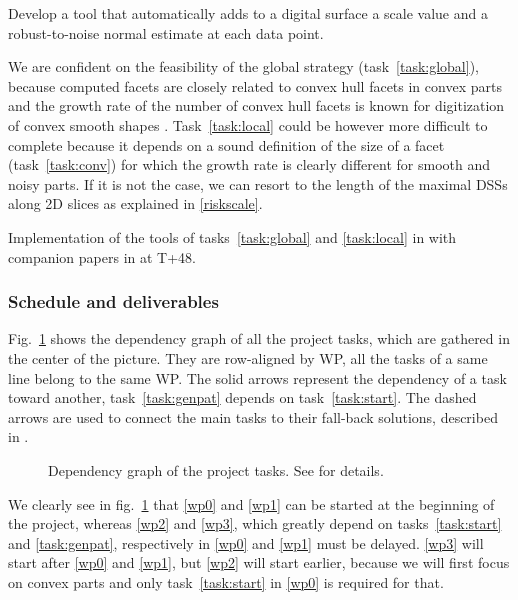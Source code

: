 \begin{Task}
  \label{task:local}
  Develop a tool that automatically adds to a digital surface a scale value and
  a robust-to-noise normal estimate at each data point. 
\end{Task}

\Risks
We are confident on the feasibility of the global strategy (task~\ref{task:global}),
because computed facets are closely related to convex hull facets in convex parts
and the growth rate of the number of convex hull facets is known for digitization
of convex smooth shapes \cite{Barany1998}. 
Task~\ref{task:local} could be however more difficult to complete
because it depends on a sound definition of the size of a facet (task~\ref{task:conv})
for which the growth rate is clearly different for smooth and noisy parts. If it is
not the case, we can resort to the length of the maximal DSSs along 2D slices
as explained in \ref{riskscale}.

\Success
  Implementation of the tools of tasks~\ref{task:global} and \ref{task:local}
    in {\DGtalTools} with companion papers in {\IPOL} at T+48.

    

\subsubsection{Schedule and deliverables}
\label{sec:schedule}

Fig.~\ref{fig:tasks} shows the dependency graph of all the project tasks, which
are gathered in the center of the picture. They are row-aligned by WP,
\ie all the tasks of a same line belong to the same WP. 
The solid arrows represent the dependency of a task toward another,
\eg task~\ref{task:genpat} depends on task~\ref{task:start}. 
The dashed arrows are used to connect the main tasks to their fall-back solutions,
described in . 

\begin{figure}[htbp]
  \centering
  
  \caption{Dependency graph of the project tasks. See  for details.}
  \label{fig:tasks}
\end{figure}

We clearly see in fig.~\ref{fig:tasks} that \ref{wp0} and \ref{wp1} can be started
at the beginning of the project, whereas \ref{wp2} and \ref{wp3}, which greatly depend
on tasks~\ref{task:start} and \ref{task:genpat}, respectively in \ref{wp0} and \ref{wp1}
must be delayed. \ref{wp3} will start after \ref{wp0} and \ref{wp1}, but \ref{wp2} will
start earlier, because we will first focus on convex parts and only task~\ref{task:start}
in \ref{wp0} is required for that.

